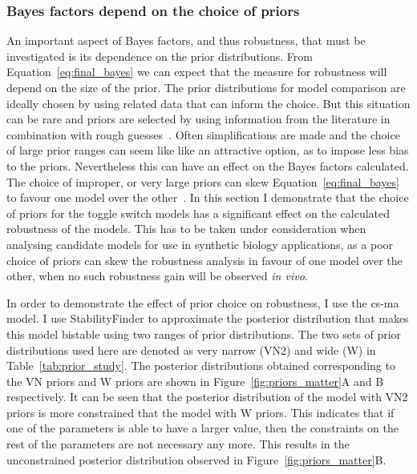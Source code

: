 \subsubsection{Bayes factors depend on the choice of priors}

An important aspect of Bayes factors, and thus robustness, that must be investigated is its dependence on the prior distributions. From Equation~\ref{eq:final_bayes} we can expect that the measure for robustness will depend on the size of the prior. The prior distributions for model comparison are ideally chosen by using related data that can inform the choice. But this situation can be rare and priors are selected by using information from the literature in combination with rough guesses~\autocite{Kass:1995vb}. Often simplifications are made and the choice of large prior ranges can seem like like an attractive option, as to impose less bias to the priors. Nevertheless this can have an effect on the Bayes factors calculated. The choice of improper, or very large priors can skew Equation~\ref{eq:final_bayes} to favour one model over the other~\autocite{Kass:1995vb}. In this section I demonstrate that the choice of priors for the toggle switch models has a significant effect on the calculated robustness of the models. This has to be taken under consideration when analysing candidate models for use in synthetic biology applications, as a poor choice of priors can skew the robustness analysis in favour of one model over the other, when no such robustness gain will be observed \textit{in vivo}.    

In order to demonstrate the effect of prior choice on robustness, I use the \acrshort{cs-ma} model. I use StabilityFinder to approximate the posterior distribution that makes this model bistable using two ranges of prior distributions. The two sets of prior distributions used here are denoted as very narrow (VN2) and wide (W) in Table~\ref{tab:prior_study}. The posterior distributions obtained corresponding to the VN priors and W priors are shown in Figure~\ref{fig:priors_matter}A and B respectively. It can be seen that the posterior distribution of the model with VN2 priors is more constrained that the model with W priors. This indicates that if one of the parameters is able to have a larger value, then the constraints on the rest of the parameters are not necessary any more. This results in the unconstrained posterior distribution observed in Figure~\ref{fig:priors_matter}B.

